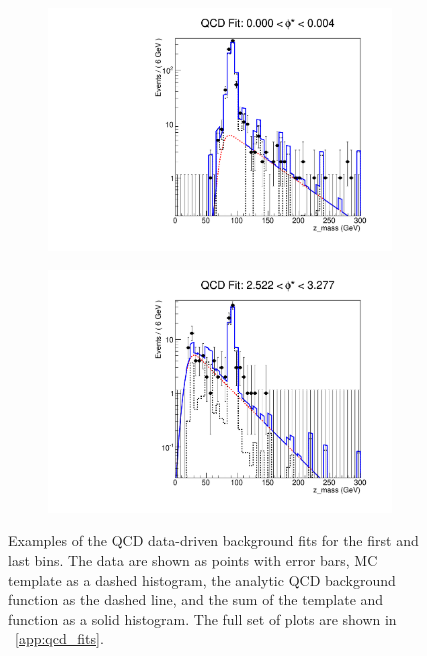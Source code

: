 \begin{figure}[!htbp]
    \centering
    \begin{subfigure}[b]{0.5\textwidth}
        \includegraphics[width=\linewidth]{figures/qcd_fits/qcd_fit_plot_for_01.pdf}
        \caption{}
        \label{fig:qcd_fit_example_01}
    \end{subfigure}%
    \begin{subfigure}[b]{0.5\textwidth}
        \includegraphics[width=\linewidth]{figures/qcd_fits/qcd_fit_plot_for_34.pdf}
        \caption{}
        \label{fig:qcd_fit_example_34}
    \end{subfigure}
    \caption{
       Examples of the QCD data-driven background fits for the first and last
       \phistar bins. The data are shown as points with error bars, MC template
       as a dashed histogram, the analytic QCD background function as the
       dashed line, and the sum of the template and function as a solid
       histogram. The full set of plots are shown in \APP~\ref{app:qcd_fits}.
    }
    \label{fig:qcd_example_fits}
\end{figure}
